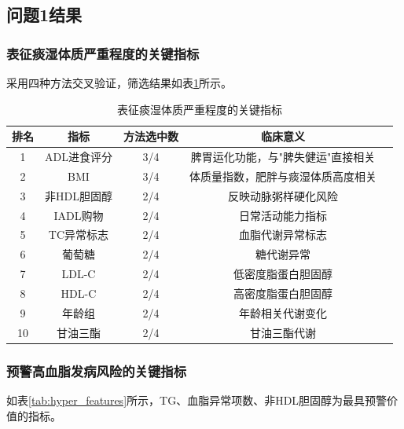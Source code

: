\documentclass[12pt,a4paper]{ctexart}
\begin{document}
\subsection{问题1结果}

\subsubsection{表征痰湿体质严重程度的关键指标}

采用四种方法交叉验证，筛选结果如表\ref{tab:tanshi_features}所示。

\begin{table}[H]
\centering
\begin{tabular}{ccccc}
\toprule
\textbf{排名} & \textbf{指标} & \textbf{方法选中数} & \textbf{临床意义} \\
\midrule
1 & ADL进食评分 & 3/4 & 脾胃运化功能，与"脾失健运"直接相关 \\
2 & BMI & 3/4 & 体质量指数，肥胖与痰湿体质高度相关 \\
3 & 非HDL胆固醇 & 2/4 & 反映动脉粥样硬化风险 \\
4 & IADL购物 & 2/4 & 日常活动能力指标 \\
5 & TC异常标志 & 2/4 & 血脂代谢异常标志 \\
6 & 葡萄糖 & 2/4 & 糖代谢异常 \\
7 & LDL-C & 2/4 & 低密度脂蛋白胆固醇 \\
8 & HDL-C & 2/4 & 高密度脂蛋白胆固醇 \\
9 & 年龄组 & 2/4 & 年龄相关代谢变化 \\
10 & 甘油三酯 & 2/4 & 甘油三酯代谢 \\
\bottomrule
\end{tabular}
\caption{表征痰湿体质严重程度的关键指标}
\label{tab:tanshi_features}
\end{table}

\subsubsection{预警高血脂发病风险的关键指标}

如表\ref{tab:hyper_features}所示，TG、血脂异常项数、非HDL胆固醇为最具预警价值的指标。
\end{document}
